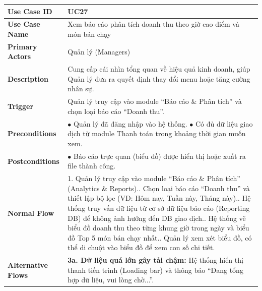 \begin{longtable}{|p{3.5cm}|p{12.5cm}|}
\hline
\textbf{Use Case ID} & UC27 \\ \hline
\textbf{Use Case Name} & Xem báo cáo phân tích doanh thu theo giờ cao điểm và món bán chạy \\ \hline
\textbf{Primary Actors} & Quản lý (Managers) \\ \hline
\textbf{Description} & Cung cấp cái nhìn tổng quan về hiệu quả kinh doanh, giúp Quản lý đưa ra quyết định thay đổi menu hoặc tăng cường nhân sự. \\ \hline
\textbf{Trigger} & Quản lý truy cập vào module ``Báo cáo \& Phân tích'' và chọn loại báo cáo ``Doanh thu''. \\ \hline
\textbf{Preconditions} &
$\bullet$ Quản lý đã đăng nhập vào hệ thống.\newline
$\bullet$ Có đủ dữ liệu giao dịch từ module Thanh toán trong khoảng thời gian muốn xem. \\ \hline
\textbf{Postconditions} & $\bullet$ Báo cáo trực quan (biểu đồ) được hiển thị hoặc xuất ra file thành công. \\ \hline
\textbf{Normal Flow} &
1. Quản lý truy cập vào module ``Báo cáo \& Phân tích'' (Analytics \& Reports).\newline
2. Chọn loại báo cáo ``Doanh thu'' và thiết lập bộ lọc (VD: Hôm nay, Tuần này, Tháng này).\newline
3. Hệ thống truy vấn dữ liệu từ cơ sở dữ liệu báo cáo (Reporting DB) để không ảnh hưởng đến DB giao dịch.\newline
4. Hệ thống vẽ biểu đồ doanh thu theo từng khung giờ trong ngày và biểu đồ Top 5 món bán chạy nhất.\newline
5. Quản lý xem xét biểu đồ, có thể di chuột vào biểu đồ để xem con số chi tiết. \\ \hline
\textbf{Alternative Flows} &
\textbf{3a. Dữ liệu quá lớn gây tải chậm:} Hệ thống hiển thị thanh tiến trình (Loading bar) và thông báo ``Đang tổng hợp dữ liệu, vui lòng chờ...''. \\ \hline
\end{longtable}


